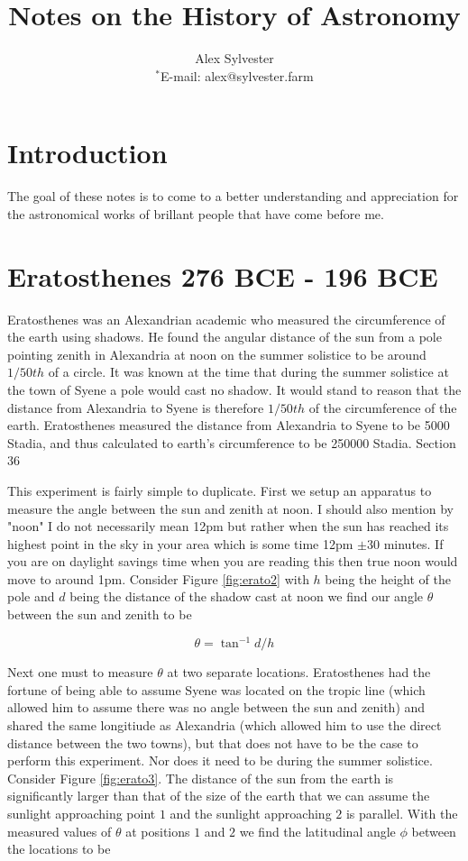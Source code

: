 \documentclass[11pt]{article} %
\title{Notes on the History of Astronomy}
\author
{Alex Sylvester
\\
\normalsize{$^\ast$E-mail: alex@sylvester.farm}
}
\date{}
\newcommand{\be}{\begin{equation}}
\newcommand{\ee}{\end{equation}}
\begin{document}
 
\maketitle 
\section{Introduction}
  The goal of these notes is to come to a better understanding and appreciation for the astronomical works of brillant people that have come before me.

\section{Eratosthenes 276 BCE - 196 BCE}
Eratosthenes was an Alexandrian academic who measured the circumference of the earth using shadows. 
He found the angular distance of the sun from a pole pointing zenith in Alexandria at noon on the summer solistice to be around $1/50th$ of a circle. 
It was known at the time that during the summer solistice at the town of Syene a pole would cast no shadow. 
It would stand to reason that the distance from Alexandria to Syene is therefore $1/50th$ of the circumference of the earth.
Eratosthenes measured the distance from Alexandria to Syene to be 5000 Stadia, and thus calculated to earth's circumference to be 250000 Stadia. \cite{berry} Section 36

This experiment is fairly simple to duplicate. First we setup an apparatus to measure the angle between the sun and zenith at noon. I should also mention by "noon" I do not necessarily mean 12pm but rather when the sun has reached its highest point in the sky in your area which is some time 12pm $\pm 30$ minutes. 
If you are on daylight savings time when you are reading this then true noon would move to around 1pm. Consider Figure \ref{fig:erato2} with $h$ being the height of the pole and $d$ being the distance of the shadow cast at noon we find our angle $\theta$ between the sun and zenith to be

\be 
\label{zenithSunAngle}
  \theta = \tan^{-1}{d/h}
\ee

Next one must to measure $\theta$ at two separate locations. Eratosthenes had the fortune of being able to assume Syene was located on the tropic line (which allowed him to assume there was no angle between the sun and zenith) and shared the same longitiude as Alexandria (which allowed him to use the direct distance between the two towns),
but that does not have to be the case to perform this experiment. Nor does it need to be during the summer solistice. Consider Figure \ref{fig:erato3}.
The distance of the sun from the earth is significantly larger than that of the size of the earth that we can assume the sunlight approaching point $1$ and the sunlight approaching $2$ is parallel.
With the measured values of $\theta$ at positions $1$ and $2$ we find the latitudinal angle $\phi$ between the locations to be
\end{document}
